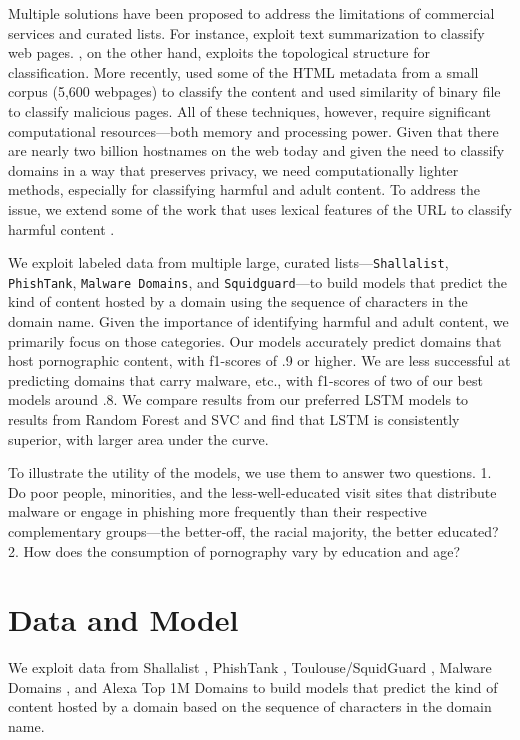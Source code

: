 \documentclass[12pt, letterpaper]{article}
\begin{document}
Multiple solutions have been proposed to address the limitations of commercial services and curated lists. For instance, \citep{shen2004web} exploit text summarization to classify web pages. \citep{zhang2010web}, on the other hand, exploits the topological structure for classification.  More recently, \citep{deri2015implementing} used some of the HTML metadata from a small corpus (5,600 webpages) to classify the content and \citep{wang2019bidirectional} used similarity of binary file to classify malicious pages. All of these techniques, however, require significant computational resources---both memory and processing power. Given that there are nearly two billion hostnames on the web today \citep{netcraft2018} and given the need to classify domains in a way that preserves privacy, we need computationally lighter methods, especially for classifying harmful and adult content. To address the issue, we extend some of the work that uses lexical features of the URL to classify harmful content \citep{aldwairi2012malurls, jain2018phish}.

We exploit labeled data from multiple large, curated lists---\texttt{Shallalist}, \texttt{PhishTank}, \texttt{Malware Domains}, and \texttt{Squidguard}---to build models that predict the kind of content hosted by a domain using the sequence of characters in the domain name. Given the importance of identifying harmful and adult content, we primarily focus on those categories. Our models accurately predict domains that host pornographic content, with f1-scores of .9 or higher. We are less successful at predicting domains that carry malware, etc., with f1-scores of two of our best models around .8. We compare results from our preferred LSTM models to results from Random Forest and SVC and find that LSTM is consistently superior, with larger area under the curve.

To illustrate the utility of the models, we use them to answer two questions. 1. Do poor people, minorities, and the less-well-educated visit sites that distribute malware or engage in phishing more frequently than their respective complementary groups---the better-off, the racial majority, the better educated? 2. How does the consumption of pornography vary by education and age?

\section{Data and Model}
We exploit data from Shallalist \citep{shalla2017}, PhishTank \citep{opendns2017}, Toulouse/SquidGuard \citep{squid2017}, Malware Domains \citep{malware2017}, and Alexa Top 1M Domains \citep{alexa2017} to build models that predict the kind of content hosted by a domain based on the sequence of characters in the domain name.
\end{document}
